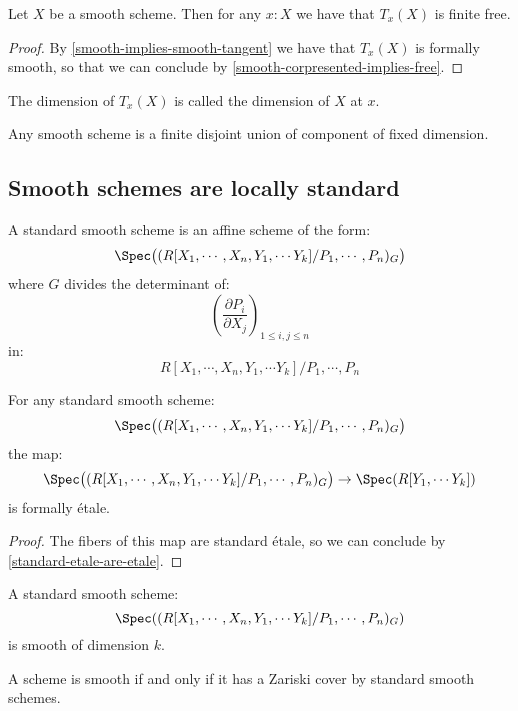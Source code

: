 \begin{proposition}\label{smooth-have-free-tangent}
Let $X$ be a smooth scheme. Then for any $x:X$ we have that $T_x(X)$ is finite free.
\end{proposition}

\begin{proof}
By \cref{smooth-implies-smooth-tangent} we have that $T_x(X)$ is formally smooth, so that we can conclude by \cref{smooth-corpresented-implies-free}.
\end{proof}

The dimension of $T_x(X)$ is called the dimension of $X$ at $x$.

\begin{corollary}
Any smooth scheme is a finite disjoint union of component of fixed dimension.
\end{corollary}

\subsection{Smooth schemes are locally standard}

\begin{definition}
A standard smooth scheme is an affine scheme of the form:
\[\Spec\big((R[X_1,\cdots,X_n,Y_1,\cdots Y_{k}] / P_1,\cdots,P_n)_G\big)\]
where $G$ divides the determinant of:
\[\left( \frac{\partial P_i}{\partial X_j}\right)_{1\leq i,j\leq n}\]
in:
\[R[X_1,\cdots,X_n,Y_1,\cdots Y_{k}] / P_1,\cdots,P_n\]
\end{definition}

\begin{lemma}\label{standard-smooth-etale-over-A}
For any standard smooth scheme:
\[\Spec\big((R[X_1,\cdots,X_n,Y_1,\cdots Y_{k}] / P_1,\cdots,P_n)_G\big)\]
the map:
\[\Spec\big((R[X_1,\cdots,X_n,Y_1,\cdots Y_{k}] / P_1,\cdots,P_n)_G\big) \to \Spec(R[Y_1,\cdots Y_{k}])\]
is formally étale.
\end{lemma}

\begin{proof}
The fibers of this map are standard étale, so we can conclude by \cref{standard-etale-are-etale}.
\end{proof}

\begin{corollary}
A standard smooth scheme:
\[\Spec((R[X_1,\cdots,X_n,Y_1,\cdots Y_{k}] / P_1,\cdots,P_n)_G)\]
is smooth of dimension $k$.
\end{corollary}

\begin{proposition}\label{smooth-are-locally-standard}
A scheme is smooth if and only if it has a Zariski cover by standard smooth schemes.
\end{proposition}

